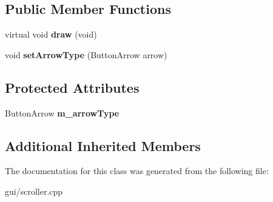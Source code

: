 \subsection*{Public Member Functions}
\begin{DoxyCompactItemize}
\item 
virtual void {\bfseries draw} (void)\hypertarget{classScrollerButton_a4015baa5a504acfc19d2c7344661ca9a}{}\label{classScrollerButton_a4015baa5a504acfc19d2c7344661ca9a}

\item 
void {\bfseries set\+Arrow\+Type} (Button\+Arrow arrow)\hypertarget{classScrollerButton_ac7d961116dcd122e0a2c5b3032e34517}{}\label{classScrollerButton_ac7d961116dcd122e0a2c5b3032e34517}

\end{DoxyCompactItemize}
\subsection*{Protected Attributes}
\begin{DoxyCompactItemize}
\item 
Button\+Arrow {\bfseries m\+\_\+arrow\+Type}\hypertarget{classScrollerButton_a915323eb82bbc2bc98168b21a01c8969}{}\label{classScrollerButton_a915323eb82bbc2bc98168b21a01c8969}

\end{DoxyCompactItemize}
\subsection*{Additional Inherited Members}


The documentation for this class was generated from the following file\+:\begin{DoxyCompactItemize}
\item 
gui/scroller.\+cpp\end{DoxyCompactItemize}
